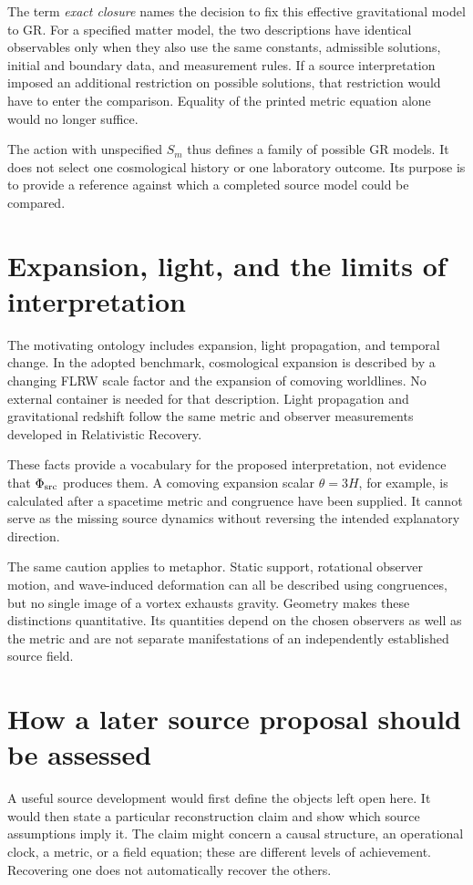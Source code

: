 \documentclass[11pt]{article}
\begin{document}
The term \emph{exact closure} names the decision to fix this effective gravitational model to GR. For a specified matter model, the two descriptions have identical observables only when they also use the same constants, admissible solutions, initial and boundary data, and measurement rules. If a source interpretation imposed an additional restriction on possible solutions, that restriction would have to enter the comparison. Equality of the printed metric equation alone would no longer suffice.

The action with unspecified $S_m$ thus defines a family of possible GR models. It does not select one cosmological history or one laboratory outcome. Its purpose is to provide a reference against which a completed source model could be compared.

\section{Expansion, light, and the limits of interpretation}
The motivating ontology includes expansion, light propagation, and temporal change. In the adopted benchmark, cosmological expansion is described by a changing FLRW scale factor and the expansion of comoving worldlines. No external container is needed for that description. Light propagation and gravitational redshift follow the same metric and observer measurements developed in Relativistic Recovery.

These facts provide a vocabulary for the proposed interpretation, not evidence that $\Phi_{\mathrm{src}}$ produces them. A comoving expansion scalar $\theta=3H$, for example, is calculated after a spacetime metric and congruence have been supplied. It cannot serve as the missing source dynamics without reversing the intended explanatory direction.

The same caution applies to metaphor. Static support, rotational observer motion, and wave-induced deformation can all be described using congruences, but no single image of a vortex exhausts gravity. Geometry makes these distinctions quantitative. Its quantities depend on the chosen observers as well as the metric and are not separate manifestations of an independently established source field.

\section{How a later source proposal should be assessed}
A useful source development would first define the objects left open here. It would then state a particular reconstruction claim and show which source assumptions imply it. The claim might concern a causal structure, an operational clock, a metric, or a field equation; these are different levels of achievement. Recovering one does not automatically recover the others.
\end{document}
